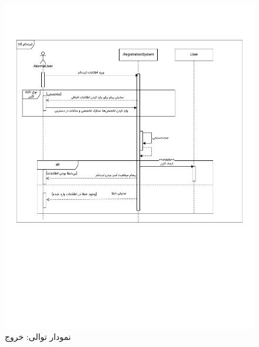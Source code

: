 \begin{figure}[ht!]
	\centering
	\includegraphics[scale=0.8, page=3]{figs/OOD-Sequence-1.pdf}
	\caption{نمودار توالی: خروج}
\end{figure}
\FloatBarrier
\newpage

